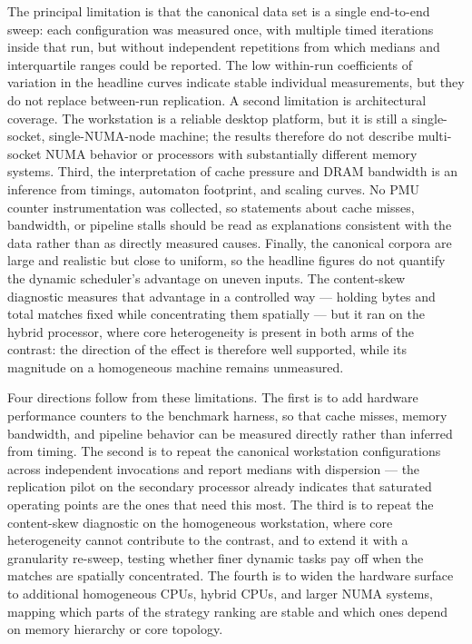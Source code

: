 The principal limitation is that the canonical data set is a single end-to-end
sweep: each configuration was measured once, with multiple timed iterations
inside that run, but without independent repetitions from which medians and
interquartile ranges could be reported. The low within-run coefficients of
variation in the headline curves indicate stable individual measurements, but
they do not replace between-run replication. A second limitation is architectural
coverage. The workstation is a reliable desktop platform, but it is still a
single-socket, single-NUMA-node machine; the results therefore do not describe
multi-socket NUMA behavior or processors with substantially different memory
systems. Third, the interpretation of cache pressure and DRAM bandwidth is an
inference from timings, automaton footprint, and scaling curves. No PMU counter
instrumentation was collected, so statements about cache misses, bandwidth, or
pipeline stalls should be read as explanations consistent with the data rather
than as directly measured causes. Finally, the canonical corpora are large and
realistic but close to uniform, so the headline figures do not quantify the
dynamic scheduler's advantage on uneven inputs. The content-skew diagnostic
measures that advantage in a controlled way --- holding bytes and total matches
fixed while concentrating them spatially --- but it ran on the hybrid processor,
where core heterogeneity is present in both arms of the contrast: the direction
of the effect is therefore well supported, while its magnitude on a homogeneous
machine remains unmeasured.


Four directions follow from these limitations. The first is to add hardware
performance counters to the benchmark harness, so that cache misses, memory
bandwidth, and pipeline behavior can be measured directly rather than inferred
from timing. The second is to repeat the canonical workstation configurations
across independent invocations and report medians with dispersion --- the
replication pilot on the secondary processor already indicates that saturated
operating points are the ones that need this most. The third is to repeat the
content-skew diagnostic on the homogeneous workstation, where core heterogeneity
cannot contribute to the contrast, and to extend it with a granularity re-sweep,
testing whether finer dynamic tasks pay off when the matches are spatially
concentrated. The fourth is to widen the hardware
surface to additional homogeneous CPUs, hybrid CPUs, and larger NUMA systems,
mapping which parts of the strategy ranking are stable and which ones depend on
memory hierarchy or core topology.
